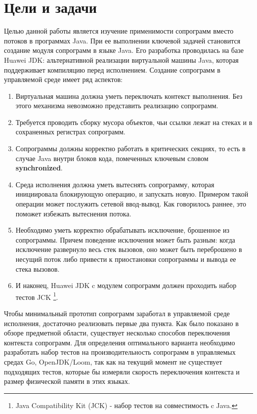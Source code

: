 \section{Цели и задачи}
	Целью данной работы является изучение применимости сопрограмм вместо потоков в программах Java. При ее выполнении ключевой задачей становится создание модуля 
	сопрограмм в языке Java.
	Его разработка проводилась на базе Huawei JDK: альтернативной реализации виртуальной машины Java, которая поддерживает компиляцию перед исполнением. 
	Создание сопрограмм в управляемой среде имеет ряд аспектов: 
	\begin{enumerate}[align=left]
		\item Виртуальная машина должна уметь переключать контекст выполнения. Без этого механизма невозможно представить реализацию сопрограмм.
		\item Требуется проводить сборку мусора объектов, чьи ссылки лежат на стеках и в сохраненных регистрах сопрограмм. 
		\item Сопрограммы должны корректно работать в критических секциях, то есть в случае Java внутри блоков кода, помеченных ключевым словом \textbf{synchronized}.
		\item Среда исполнения должна уметь вытеснять сопрограмму, которая инициировала
		блокирующую операцию, и запускать новую. Примером такой операции может послужить
		сетевой ввод-вывод. Как говорилось раннее, это поможет избежать вытеснения потока.
		\item Необходимо уметь корректно обрабатывать исключение, брошенное из сопрограммы. Причем поведение исключения может быть разным: когда исключение
		развернуло весь стек вызовов, оно может быть переброшено в
		несущий поток либо привести к приостановки сопрограммы и вывода ее стека вызовов.
		\item И наконец, Huawei JDK c модулем сопрограмм должен проходить набор тестов JCK
		\footnote{Java Compatibility Kit (JCK) - набор тестов на совместимость c Java.}.
	\end{enumerate}
	Чтобы минимальный прототип сопрограмм заработал в управляемой среде исполнения, достаточно реализовать первые 
	два пункта. Как было показано в обзоре предметной области, существует несколько способов
	переключения контекста сопрограмм. Для определения оптимального варианта необходимо разработать 
	набор тестов на производительность сопрограмм в управляемых средах Go, OpenJDK/Loom, 
	так как на текущий момент не существует подходящих тестов, которые бы измеряли скорость 
	переключения контекста и размер физической памяти в этих языках.
